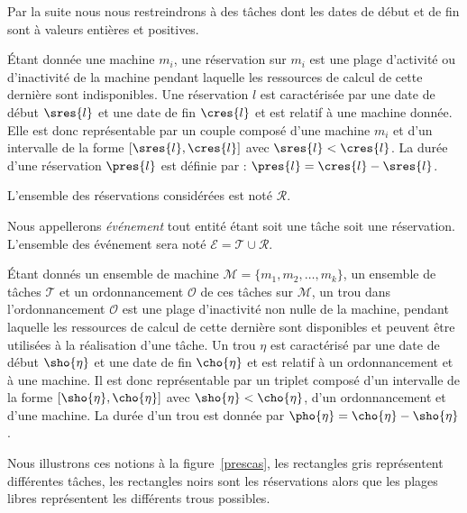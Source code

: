 \documentclass[a4paper,9pt]{report}
\begin{document}
\begin{nrmq}
    Par la suite nous nous restreindrons à des tâches dont les dates de début et de fin sont à
    valeurs entières et positives.
\end{nrmq}

\begin{ndf}[Réservation]
    Étant donnée une machine $m_i$, une réservation sur $m_i$ est une plage d'activité ou
    d'inactivité de la machine pendant laquelle les ressources de calcul de cette dernière sont
    indisponibles. Une réservation $l$ est caractérisée par une date de début $\sres{l}$ et une date de fin
    $\cres{l}$ et est relatif à une machine donnée. Elle est donc représentable par un couple composé
    d'une machine $m_i$ et d'un intervalle de la forme $[\sres{l}, \cres{l}]$ avec $\sres{l} < \cres{l}$.
    La durée d'une réservation $\pres{l}$ est définie par :  $\pres{l} = \cres{l} - \sres{l}$.

    L'ensemble des réservations considérées est noté $\mathcal{R}$.
\end{ndf}

\begin{nrmq}
    Nous appellerons \emph{événement} tout entité étant soit une tâche soit une réservation.
    L'ensemble des événement sera noté $\mathcal{E} = \mathcal{T} \cup \mathcal{R}$.
\end{nrmq}

\begin{ndf}[Trou]
    Étant donnés un ensemble de machine $\mathcal{M} = \{m_1, m_2, \dots, m_k\}$, un ensemble de
    tâches $\mathcal{T}$ et un ordonnancement $\mathcal{O}$ de ces tâches sur $\mathcal{M}$, un trou
    dans l'ordonnancement $\mathcal{O}$ est une plage d'inactivité non nulle de la machine, pendant
    laquelle les ressources de calcul de cette dernière sont disponibles et peuvent être utilisées à
    la réalisation d'une tâche. Un trou $\eta$ est caractérisé par une date de début $\sho{\eta}$ et
    une date de fin $\cho{\eta}$ et est relatif à un ordonnancement et à une machine. Il est donc
    représentable par un triplet composé d'un intervalle de la forme $[\sho{\eta}, \cho{\eta}]$ avec
    $\sho{\eta} < \cho{\eta}$, d'un ordonnancement et d'une machine. La durée d'un trou est donnée
    par $\pho{\eta} = \cho{\eta} - \sho{\eta}$.
\end{ndf}

\begin{nrmq}
    Nous illustrons ces notions à la figure~\ref{prescas}, les rectangles gris
    représentent différentes tâches, les rectangles noirs sont les réservations alors que les plages
    libres représentent les différents trous possibles.
\end{nrmq}
\end{document}

